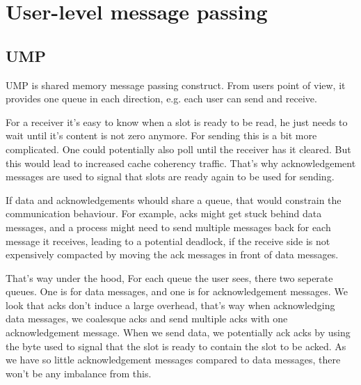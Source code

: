 \chapter{User-level message passing}

\section{UMP}

UMP is shared memory message passing construct.
From users point of view, it provides one queue in each direction, e.g. each
user can send and receive.

For a receiver it's easy to know when a slot is ready to be read, he just needs
to wait until it's content is not zero anymore.
For sending this is a bit more complicated.
One could potentially also poll until the receiver has it cleared.
But this would lead to increased cache coherency traffic.
That's why acknowledgement messages are used to signal that slots are ready
again to be used for sending.

If data and acknowledgements whould share a queue, that would constrain the
communication behaviour.
For example, acks might get stuck behind data messages, and a process might need
to send multiple messages back for each message it receives, leading to a
potential deadlock, if the receive side is not expensively compacted by moving
the ack messages in front of data messages.

That's way under the hood, For each queue the user sees, there two seperate
queues.
One is for data messages, and one is for acknowledgement messages.
We look that acks don't induce a large overhead, that's way when acknowledging
data messages, we coalesque acks and send multiple acks with one acknowledgement
message.
When we send data, we potentially ack acks by using
the byte used to signal that the slot is ready to contain the slot to be acked.
As we have so little acknowledgement messages compared to data messages, there
won't be any imbalance from this.
